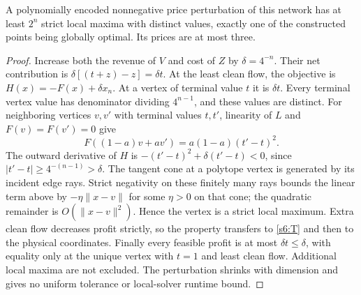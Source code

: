 \begin{corollary}\label{s6:local}
A polynomially encoded nonnegative price perturbation of this network
has at least $2^n$ strict local maxima with distinct values, exactly one
of the constructed points being globally optimal. Its prices are at
most three.
\end{corollary}
\begin{proof}
Increase both the revenue of $V$ and cost of $Z$ by $\delta=4^{-n}$.
Their net contribution is $\delta[(t+z)-z]=\delta t$.
At the least clean flow, the objective is $H(x)=-F(x)+\delta x_n$.
At a vertex of terminal value $t$ it is $\delta t$. Every terminal
vertex value has denominator dividing $4^{n-1}$, and these values are
distinct. For neighboring vertices $v,v'$ with terminal values $t,t'$,
linearity of $L$ and $F(v)=F(v')=0$ give
\[
 F((1-a)v+av')=a(1-a)(t'-t)^2.
\]
The outward derivative of $H$ is
$-(t'-t)^2+\delta(t'-t)<0$, since $|t'-t|\ge4^{-(n-1)}>\delta$.
The tangent cone at a polytope vertex is generated by its incident edge
rays. Strict negativity on these finitely many rays bounds the linear
term above by $-\eta\|x-v\|$ for some $\eta>0$ on that cone; the
quadratic remainder is $O(\|x-v\|^2)$. Hence the vertex is a strict
local maximum. Extra clean flow decreases profit strictly, so the
property transfers to \eqref{s6:T} and then to the physical coordinates.
Finally every feasible profit is at most $\delta t\le\delta$, with
equality only at the unique vertex with $t=1$ and least clean flow.
Additional local maxima are not excluded. The perturbation shrinks
with dimension and gives no uniform tolerance or local-solver runtime
bound.
\end{proof}

